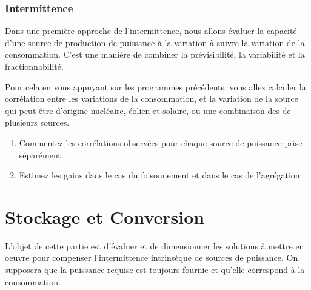 \documentclass[12pt,a4,french]{article}
\begin{document}
\section{Intermittence}

Dans une première approche de l'intermittence, nous allons évaluer la
capacité d'une source de production de puissance à la variation à suivre la variation de la consommation. C'est une manière de combiner la prévisibilité, la variabilité et la fractionnabilité.

Pour cela en vous appuyant sur les programmes précédents, vous allez calculer la corrélation entre les variations de la consommation, et la variation de la source qui peut être d'origine nucléaire, éolien et solaire, ou une combinaison des de plusieurs sources.

\begin{enumerate}
	\item Commentez les corrélations observées pour chaque source de puissance prise séparément.
	\item Estimez les gains dans le cas du foisonnement et dans le cas de l'agrégation.
\end{enumerate}



\part{Stockage et Conversion}
L'objet de cette partie est d'évaluer et de dimensionner les solutions à mettre en oeuvre pour compenser l'intermittence intrinsèque de sources de puissance. On supposera que la puissance requise est toujours fournie et qu'elle correspond à la consommation.


%	
%	
%	
%	
%	
\end{document}
